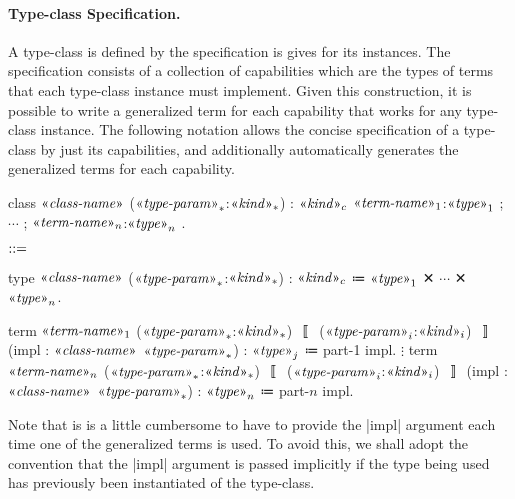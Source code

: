 \paragraph{Type-class Specification.}
A type-class is defined by the specification is gives for its instances.
The specification consists of a collection of capabilities which are the types of terms that each type-class instance must implement.
Given this construction, it is possible to write a generalized term for each capability that works for any type-class instance.
The following notation allows the concise specification of a type-class by just its capabilities, and additionally automatically generates the generalized terms for each capability.
\begin{notational}[caption={Notation for type-class specification},  label={lst:notation-type-class-def}]
class $\mvar{class-name}$ ($\mvar{type-param}_*$:$\mvar{kind}_*$) : $\mvar{kind}_c$
  { $\mvar{term-name}_1$:$\mvar{type}_1$ ; $\cdots$ ; $\mvar{term-name}_n$:$\mvar{type}_n$ }.

$\syneq$

type $\mvar{class-name}$ ($\mvar{type-param}_*$:$\mvar{kind}_*$) : $\mvar{kind}_c$
  ≔ $\mvar{type}_1$ ✕ $\cdots$ ✕ $\mvar{type}_n$.

term $\mvar{term-name}_1$ ($\mvar{type-param}_*$:$\mvar{kind}_*$) $〚$ ($\mvar{type-param}_i$:$\mvar{kind}_i$) $〛$
      (impl : $\mvar{class-name}$ $\mvar{type-param}_*$)
  : $\mvar{type}_j$
  ≔ part-1 impl.
$\vdots$
term $\mvar{term-name}_n$ ($\mvar{type-param}_*$:$\mvar{kind}_*$) $〚$ ($\mvar{type-param}_i$:$\mvar{kind}_i$) $〛$
      (impl : $\mvar{class-name}$ $\mvar{type-param}_*$)
  : $\mvar{type}_n$
  ≔ part-$n$ impl.
\end{notational}
Note that is is a little cumbersome to have to provide the \code|impl| argument each time one of the generalized terms is used.
To avoid this, we shall adopt the convention that the \code|impl| argument is passed implicitly if the type being used has previously been instantiated of the type-class.

